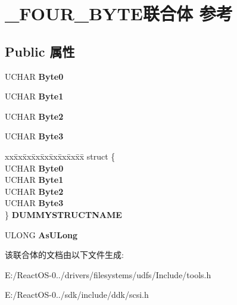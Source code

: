 \hypertarget{struct___f_o_u_r___b_y_t_e}{}\section{\+\_\+\+F\+O\+U\+R\+\_\+\+B\+Y\+T\+E联合体 参考}
\label{struct___f_o_u_r___b_y_t_e}
\subsection*{Public 属性}
\begin{DoxyCompactItemize}
\item 
\mbox{\label{struct___f_o_u_r___b_y_t_e_a3c77d9bade1a8ab638ce7626bc3ef9f4}} 
U\+C\+H\+AR {\bfseries Byte0}
\item 
\mbox{\label{struct___f_o_u_r___b_y_t_e_abb5d1f0a1b8d6faff0f582b7d173c680}} 
U\+C\+H\+AR {\bfseries Byte1}
\item 
\mbox{\label{struct___f_o_u_r___b_y_t_e_aca72336e06901c1012af03437653cc3c}} 
U\+C\+H\+AR {\bfseries Byte2}
\item 
\mbox{\label{struct___f_o_u_r___b_y_t_e_ae7eaae314be8d61903593af98491f14d}} 
U\+C\+H\+AR {\bfseries Byte3}
\item 
\mbox{\label{struct___f_o_u_r___b_y_t_e_a03f80eff7c66b303799b37b9e6c74f01}} 
\begin{tabbing}
xx\=xx\=xx\=xx\=xx\=xx\=xx\=xx\=xx\=\kill
struct \{\\
\>UCHAR {\bfseries Byte0}\\
\>UCHAR {\bfseries Byte1}\\
\>UCHAR {\bfseries Byte2}\\
\>UCHAR {\bfseries Byte3}\\
\} {\bfseries DUMMYSTRUCTNAME}\\

\end{tabbing}\item 
\mbox{\label{struct___f_o_u_r___b_y_t_e_af1eee0f1e942cd60b45d3eb8c3b7cc80}} 
U\+L\+O\+NG {\bfseries As\+U\+Long}
\end{DoxyCompactItemize}


该联合体的文档由以下文件生成\+:\begin{DoxyCompactItemize}
\item 
E\+:/\+React\+O\+S-\/0../drivers/filesystems/udfs/\+Include/tools.\+h\item 
E\+:/\+React\+O\+S-\/0../sdk/include/ddk/scsi.\+h\end{DoxyCompactItemize}
